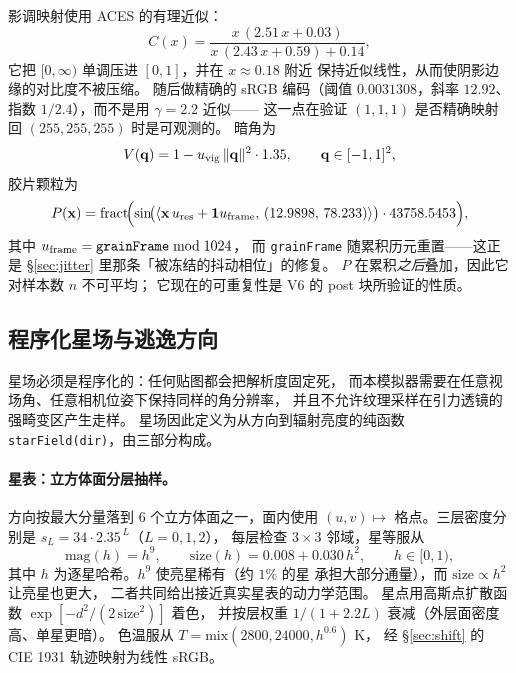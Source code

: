 影调映射使用 ACES 的有理近似：
\begin{equation}
C(x)=\frac{x\,(2.51\,x+0.03)}{x\,(2.43\,x+0.59)+0.14},
\label{eq:aces}
\end{equation}
它把 $[0,\infty)$ 单调压进 $[0,1]$，并在 $x\approx0.18$ 附近
保持近似线性，从而使阴影边缘的对比度不被压缩。
随后做精确的 sRGB 编码（阈值 $0.0031308$，斜率 $12.92$、
指数 $1/2.4$），而不是用 $\gamma=2.2$ 近似——
这一点在验证 $(1,1,1)$ 是否精确映射回 $(255,255,255)$
时是可观测的。
暗角为
\begin{equation}
V(\mathbf{q})=1-u_{\rm vig}\,\lVert\mathbf{q}\rVert^{2}\cdot1.35,
\qquad \mathbf{q}\in[-1,1]^{2},
\label{eq:vignette}
\end{equation}
胶片颗粒为
\begin{equation}
P(\mathbf{x})=\operatorname{fract}\!\Bigl(
\sin\!\bigl(\langle \mathbf{x}\,u_{\rm res}+\mathbf{1}u_{\rm frame},\,
(12.9898,\,78.233)\rangle\bigr)\cdot43758.5453\Bigr),
\label{eq:grain}
\end{equation}
其中 $u_{\rm frame}=\texttt{grainFrame}\bmod1024$，
而 \texttt{grainFrame} 随累积历元重置——这正是
§\ref{sec:jitter} 里那条「被冻结的抖动相位」的修复。
$P$ 在累积\emph{之后}叠加，因此它对样本数 $n$ 不可平均；
它现在的可重复性是 V6 的 post 块所验证的性质。

\subsection{程序化星场与逃逸方向}\label{sec:stars}

星场必须是程序化的：任何贴图都会把解析度固定死，
而本模拟器需要在任意视场角、任意相机位姿下保持同样的角分辨率，
并且不允许纹理采样在引力透镜的强畸变区产生走样。
星场因此定义为从方向到辐射亮度的纯函数
\texttt{starField(dir)}，由三部分构成。

\paragraph{星表：立方体面分层抽样。}
方向按最大分量落到 6 个立方体面之一，面内使用
$(u,v)\mapsto$ 格点。三层密度分别是
$s_L=34\cdot2.35^{\,L}$（$L=0,1,2$），
每层检查 $3\times3$ 邻域，星等服从
\begin{equation}
\mathrm{mag}(h)=h^{9},\qquad
\mathrm{size}(h)=0.008+0.030\,h^{2},\qquad h\in[0,1),
\label{eq:starmag}
\end{equation}
其中 $h$ 为逐星哈希。$h^{9}$ 使亮星稀有（约 $1\%$ 的星
承担大部分通量），而 $\mathrm{size}\propto h^{2}$ 让亮星也更大，
二者共同给出接近真实星表的动力学范围。
星点用高斯点扩散函数 $\exp[-d^{2}/(2\,\mathrm{size}^{2})]$ 着色，
并按层权重 $1/(1+2.2L)$ 衰减（外层面密度高、单星更暗）。
色温服从 $T=\mathrm{mix}(2800,24000,h^{0.6})$ K，
经 §\ref{sec:shift} 的 CIE 1931 轨迹映射为线性 sRGB。

